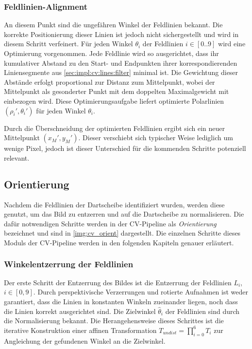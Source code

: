 \subsubsection{Feldlinien-Alignment}
\label{sec:impl:cv:lines:lines_align}

An diesem Punkt sind die ungefähren Winkel der Feldlinien bekannt. Die korrekte Positionierung dieser Linien ist jedoch nicht sichergestellt und wird in diesem Schritt verfeinert. Für jeden Winkel $\theta_i$ der Feldlinien $i \in [0..9]$ wird eine Optimierung vorgenommen. Jede Feldlinie wird so ausgerichtet, dass ihr kumulativer Abstand zu den Start- und Endpunkten ihrer korrespondierenden Liniensegmente aus \autoref{sec:impl:cv:lines:filter} minimal ist. Die Gewichtung dieser Abstände erfolgt proportional zur Distanz zum Mittelpunkt, wobei der Mittelpunkt als gesonderter Punkt mit dem doppelten Maximalgewicht mit einbezogen wird. Diese Optimierungsaufgabe liefert optimierte Polarlinien $(\rho_i', \theta_i')$ für jeden Winkel $\theta_i$.

Durch die Überschneidung der optimierten Feldlinien ergibt sich ein neuer Mittelpunkt $(x_M', y_M')$. Dieser verschiebt sich typischer Weise lediglich um wenige Pixel, jedoch ist dieser Unterschied für die kommenden Schritte potenziell relevant.


\subsection{Orientierung}
\label{sec:impl:cv:orient}

Nachdem die Feldlinien der Dartscheibe identifiziert wurden, werden diese genutzt, um das Bild zu entzerren und auf die Dartscheibe zu normalisieren. Die dafür notwendigen Schritte werden in der CV-Pipeline als \textit{Orientierung} bezeichnet und sind in \autoref{img:cv_orient} dargestellt. Die einzelnen Schritte dieses Moduls der CV-Pipeline werden in den folgenden Kapiteln genauer erläutert.

\subsubsection{Winkelentzerrung der Feldlinien}
\label{sec:impl:cv:orient:angles}

Der erste Schritt der Entzerrung des Bildes ist die Entzerrung der Feldlinien $L_i$, $i\in[0, 9]$. Durch perspektivische Verzerrungen und rotierte Aufnahmen ist weder garantiert, dass die Linien in konstanten Winkeln zueinander liegen, noch dass die Linien korrekt ausgerichtet sind. Die Zielwinkel $\hat{\theta}_i$ der Feldlinien sind durch die Normalisierung bekannt. Die Herangehensweise dieses Schrittes ist die iterative Konstruktion einer affinen Transformation $T_{undist} = \prod_{i=0}^{6}T_i$ zur Angleichung der gefundenen Winkel an die Zielwinkel.

